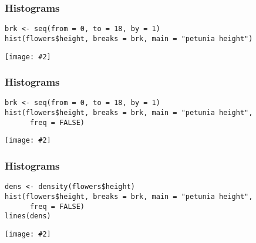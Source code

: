 \documentclass{beamer}
\newcommand{\lsting}[1]{\begin{lstlisting}[basicstyle=#1]}
\newcommand{\fig}[2]{\centerline{\texttt{[image: \#2]}}}
\newcommand{\bfr}[1]{\begin{frame}[fragile]\frametitle{{ #1 }}}
\begin{document}
\bfr{Histograms}
\lsting{\scriptsize}
brk <- seq(from = 0, to = 18, by = 1)
hist(flowers$height, breaks = brk, main = "petunia height")
\end{lstlisting}
\fig{.8}{plot8-1.png}
\end{frame}

\bfr{Histograms}
\lsting{\scriptsize}
brk <- seq(from = 0, to = 18, by = 1)
hist(flowers$height, breaks = brk, main = "petunia height",
      freq = FALSE)
\end{lstlisting}
\fig{.8}{plot9-1.png}
\end{frame}

\bfr{Histograms}
\lsting{\scriptsize}
dens <- density(flowers$height)
hist(flowers$height, breaks = brk, main = "petunia height",
      freq = FALSE)
lines(dens)
\end{lstlisting}
\fig{.8}{plot10-1.png}
\end{frame}
\end{document}
